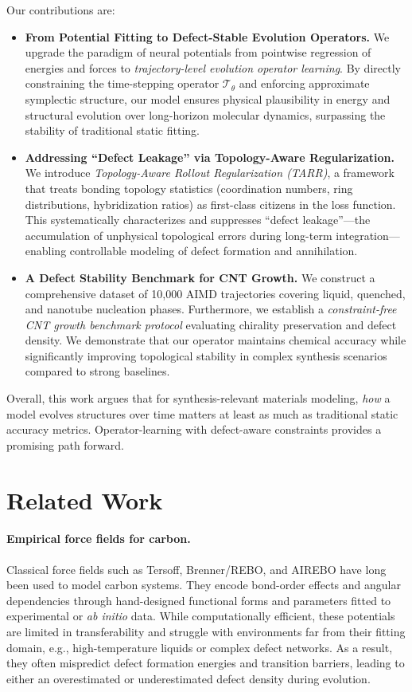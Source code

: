 \documentclass{article}
\begin{document}
Our contributions are:
\begin{itemize}
    \item \textbf{From Potential Fitting to Defect-Stable Evolution Operators.} We upgrade the paradigm of neural potentials from pointwise regression of energies and forces to \emph{trajectory-level evolution operator learning}. By directly constraining the time-stepping operator $\mathcal{T}_\theta$ and enforcing approximate symplectic structure, our model ensures physical plausibility in energy and structural evolution over long-horizon molecular dynamics, surpassing the stability of traditional static fitting.
    \item \textbf{Addressing ``Defect Leakage'' via Topology-Aware Regularization.} We introduce \emph{Topology-Aware Rollout Regularization (TARR)}, a framework that treats bonding topology statistics (coordination numbers, ring distributions, hybridization ratios) as first-class citizens in the loss function. This systematically characterizes and suppresses ``defect leakage''---the accumulation of unphysical topological errors during long-term integration---enabling controllable modeling of defect formation and annihilation.
    \item \textbf{A Defect Stability Benchmark for CNT Growth.} We construct a comprehensive dataset of 10{,}000 AIMD trajectories covering liquid, quenched, and nanotube nucleation phases. Furthermore, we establish a \emph{constraint-free CNT growth benchmark protocol} evaluating chirality preservation and defect density. We demonstrate that our operator maintains chemical accuracy while significantly improving topological stability in complex synthesis scenarios compared to strong baselines.
\end{itemize}

Overall, this work argues that for synthesis-relevant materials modeling, \emph{how} a model evolves structures over time matters at least as much as traditional static accuracy metrics. Operator-learning with defect-aware constraints provides a promising path forward.

\section{Related Work}
\label{sec:related}

\paragraph{Empirical force fields for carbon.}
Classical force fields such as Tersoff, Brenner/REBO, and AIREBO have long been used to model carbon systems. They encode bond-order effects and angular dependencies through hand-designed functional forms and parameters fitted to experimental or \emph{ab initio} data. While computationally efficient, these potentials are limited in transferability and struggle with environments far from their fitting domain, e.g., high-temperature liquids or complex defect networks. As a result, they often mispredict defect formation energies and transition barriers, leading to either an overestimated or underestimated defect density during evolution.
\end{document}
